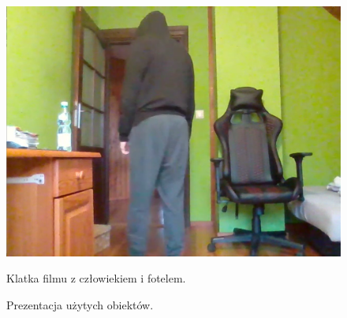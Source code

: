 \begin{figure}[H]
\begin{minipage}{0.32\textwidth}
        \includegraphics[width=\linewidth]{r_test_dokładności/vid_pics/1g_2.png}
        \caption{Klatka filmu z człowiekiem i fotelem.}
    \end{minipage}
    \caption{Prezentacja użytych obiektów.}
    \label{fig:all_objects}
\end{figure}
